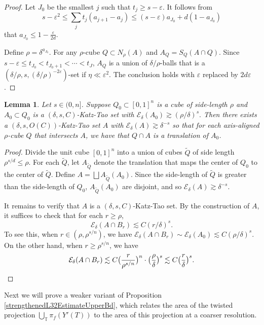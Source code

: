 \documentclass[letterpaper, reqno,11pt]{article}
\numberwithin{equation}{section}
\newcommand{\cP}{A}
\newcommand{\eps}{\varepsilon}
\newcommand{\tubes}{\mathbb{T}}
\numberwithin{thm}{section}
\newtheorem{lem}[thm]{Lemma}
\theoremstyle{remark}
\begin{document}
\begin{proof}
Let $J_0$ be the smallest $j$ such that $t_j\geq s-\eps$. It follows from 
\[
s-\eps^2 \leq  \sum_j t_j(a_{j+1}-a_j) \leq (s-\eps)a_{J_0}  + d(1-a_{J_0}) 
\]
 that $a_{J_0} \leq 1- \frac{\eps}{2d}.$

 Define  $\rho=\delta^{a_{J_0}}$. For any $\rho$-cube $Q\subset N_{\rho}(\cP)$ and $\cP_Q=S_Q(\cP\cap Q)$. Since $s-\eps \leq t_{J_0}<t_{J_0+1}<\cdots <t_J$, $\cP_Q$ is a union of $\delta/\rho$-balls that is a $(\delta/\rho, s, (\delta/\rho)^{-2\eps})$-set if $\eta\ll \eps^2$.  The conclusion holds with $\eps$ replaced by $2d\eps$. 
\end{proof}


\begin{lem}\label{lem: construct}
    Let $s\in (0, n]$. Suppose $Q_0\subset[0,1]^n$ is a cube of side-length $\rho$ and $\cP_0\subset Q_0$ is a $(\delta, s, C)$-Katz-Tao set with $\mathcal{E}_{\delta}(\cP_0)\gtrsim (\rho/\delta)^s.$ Then there exists a $(\delta, s, O(C))$-Katz-Tao set $\cP$ with $\mathcal{E}_{\delta}(\cP)\gtrsim \delta^{-s}$ so that for each axis-aligned $\rho$-cube $Q$ that intersects $\cP$, we have that $Q\cap \cP$ is a translation of $\cP_0$. 
\end{lem}
\begin{proof}
    Divide the unit cube $[0,1]^n$ into a union of cubes $\tilde{Q}$ of side length $\rho^{s/d} \leq \rho$.  For each $\tilde{Q}$, let $A_{\tilde{Q}}$ denote the translation that maps the center of $Q_0$ to the center of $\tilde{Q}$. Define $\cP=\bigsqcup A_{\tilde{Q}}(\cP_0)$. Since the side-length of $\tilde{Q}$ is greater than the side-length of $Q_0$, $A_{\tilde{Q}}(\cP_0)$ are disjoint, and so $\mathcal{E}_{\delta}(\cP)\gtrsim \delta^{-s}$. 

    It remains to verify that $\cP$ is a $(\delta, s, C)$-Katz-Tao set.  By the construction of $\cP$, it suffices to check that for each $r\geq \rho$, 
    \[
    \mathcal{E}_{\delta}(\cP\cap B_r) \lesssim C (r/\delta)^s. 
    \]
    To see this, when $r\in (\rho, \rho^{s/n})$, we have
    $\mathcal{E}_{\delta}(\cP\cap B_r)\sim \mathcal{E}_{\delta}(\cP_0) \lesssim C (\rho/\delta)^s.$ On the other hand, when $r\geq \rho^{s/n}$,  we have
    \[
    \mathcal{E}_{\delta}(\cP\cap B_r)\lesssim C \big(\frac{r}{\rho^{s/n}}\big)^n \cdot  \big(\frac{\rho}{\delta}\big)^s \lesssim C \big(\frac{r}{\delta}\big)^s.\qedhere
    \]
\end{proof}

Next we will prove a weaker variant of Proposition \ref{strengthenedL32EstimateUpperBd}, which relates the area of the twisted projection $\bigcup_{\tubes}\pi_f (Y'(T))$ to the area of this projection at a coarser resolution.
\end{document}

